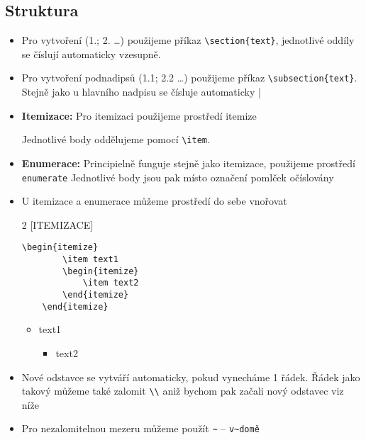 \subsection{Struktura}
\begin{itemize}
    \item Pro vytvoření (1.; 2. \dots) použijeme příkaz \verb|\section{text}|, jednotlivé oddíly se číslují automaticky vzesupně.
    \item Pro vytvoření podnadipsů (1.1; 2.2 \dots) použijeme příkaz  \verb|\subsection{text}|. Stejně jako u hlavního nadpisu se čísluje automaticky
   |
    \item \textbf{Itemizace:} Pro itemizaci použijeme prostředí itemize

    Jednotlivé body oddělujeme pomocí \verb|\item|.
    \item \textbf{Enumerace:} Principielně funguje stejně jako itemizace, použijeme prostředí \texttt{enumerate}  Jednotlivé body jsou pak místo označení pomlček  očíslovány
    \item U itemizace a enumerace můžeme prostředí do sebe vnořovat


    \begin{multicols}{2}
    [ITEMIZACE]
    \setlength{\columnsep}{10cm}
     \begin{lstlisting}[frame = single]
    \begin{itemize}
        \item text1
        \begin{itemize}
            \item text2
        \end{itemize}
    \end{itemize}
    \end{lstlisting}
    \columnbreak
   \begin{centering}

   \end{centering}
     \begin{itemize}
        \item text1
        \begin{itemize}
            \item text2
        \end{itemize}
    \end{itemize}
    
    \end{multicols}

          
        
        
    \item Nové odstavce se vytváří automaticky, pokud vynecháme 1 řádek. Řádek jako takový můžeme také zalomit \verb|\\| aniž bychom pak začali nový odstavec viz níže
    \item Pro nezalomitelnou mezeru můžeme použít \verb|~| -- \verb|v~domě|
\end{itemize}
 
